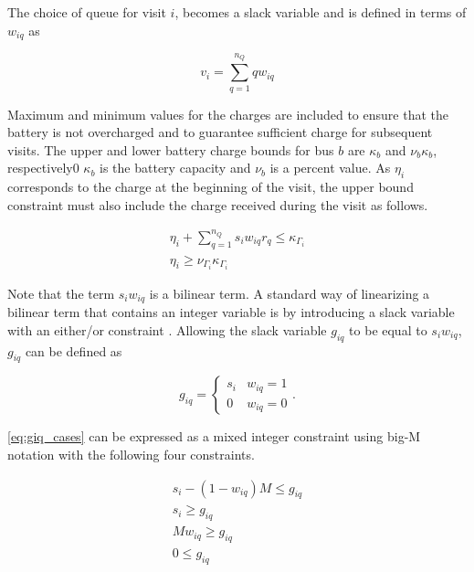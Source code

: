 \documentclass[ee,msthesis]{usuthesis}
\begin{document}
The choice of queue for visit \(i\), becomes a slack variable and is defined in terms of \(w_{iq}\) as

\begin{equation}
    v_i = \sum_{q=1}^{n_Q} qw_{iq}
\end{equation}

Maximum and minimum values for the charges are included to ensure that the battery is not overcharged and to guarantee
sufficient charge for subsequent visits. The upper and lower battery charge bounds for bus \(b\) are \(\kappa_b\) and \(\nu_b \kappa_b\),
respectively0 \(\kappa_b\) is the battery capacity and \(\nu_b\) is a percent value. As \(\eta_i\) corresponds to the charge at the
beginning of the visit, the upper bound constraint must also include the charge received during the visit as follows.

\begin{subequations}
    \label{subeq:pre_min_max}
\begin{align}
    \eta_i + \sum_{q=1}^{n_Q} s_i w_{iq} r_q \leq \kappa_{\Gamma_i}                 \\
    \eta_i \geq \nu_{\Gamma_i} \kappa_{\Gamma_i}
\end{align}
\end{subequations}

Note that the term \(s_i w_{iq}\) is a bilinear term. A standard way of linearizing a bilinear term that contains an
integer variable is by introducing a slack variable with an either/or constraint
\cite[,rodriguez-2013-compar-asses]{chen-2010-applied}. Allowing the slack variable \(g_{iq}\) to be equal to \(s_i w_{iq}\),
\(g_{iq}\) can be defined as

\begin{equation}
    \label{eq:giq_cases}
    g_{iq} =
    \begin{cases}
        s_i & w_{iq} = 1 \\
        0 & w_{iq} = 0
    \end{cases}.
\end{equation}

\autoref{eq:giq_cases} can be expressed as a mixed integer constraint using big-M notation with the following four
constraints.

\begin{subequations}
    \label{eq:slack_gain}
\begin{align}
    s_i - (1 - w_{iq})M \leq g_{iq}  \label{subeq:repgpgret} \\
    s_i \geq g_{iq}                 \label{subeq:repgples} \\
    Mw_{iq} \geq g_{iq}              \label{subeq:repgwgret} \\
    0 \leq g_{iq}                   \label{subeq:repgwles}
\end{align}
\end{subequations}
\end{document}
